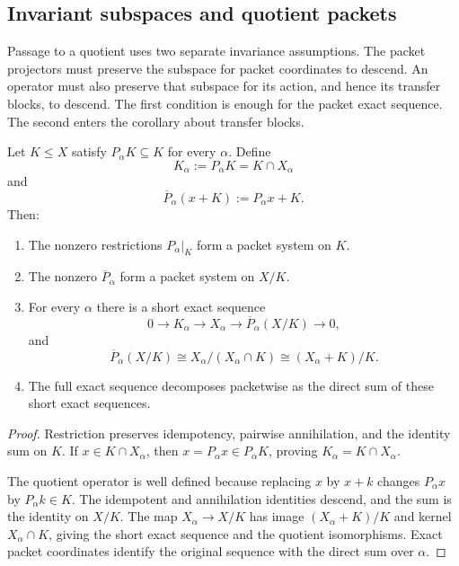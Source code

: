 \subsection{Invariant subspaces and quotient packets}
Passage to a quotient uses two separate invariance assumptions.  The packet projectors must preserve the subspace for packet coordinates to descend.  An operator must also preserve that subspace for its action, and hence its transfer blocks, to descend.  The first condition is enough for the packet exact sequence.  The second enters the corollary about transfer blocks.

\begin{theorem}
\label{thm:packet-exact-sequence}
Let $K\leq X$ satisfy $P_\alpha K\subseteq K$ for every $\alpha$.  Define
\[
K_\alpha:=P_\alpha K=K\cap X_\alpha
\]
and
\[
\overline P_\alpha(x+K):=P_\alpha x+K.
\]
Then:
\begin{enumerate}[label=(\roman*)]
\item The nonzero restrictions $P_\alpha|_K$ form a packet system on $K$.
\item The nonzero $\overline P_\alpha$ form a packet system on $X/K$.
\item For every $\alpha$ there is a short exact sequence
\[
0\longrightarrow K_\alpha
\longrightarrow X_\alpha
\longrightarrow \overline P_\alpha(X/K)
\longrightarrow0,
\]
and
\[
\overline P_\alpha(X/K)
\cong
X_\alpha/(X_\alpha\cap K)
\cong
(X_\alpha+K)/K.
\]
\item The full exact sequence decomposes packetwise as the direct sum of these short exact sequences.
\end{enumerate}
\end{theorem}

\begin{proof}
Restriction preserves idempotency, pairwise annihilation, and the identity sum on $K$.  If $x\in K\cap X_\alpha$, then $x=P_\alpha x\in P_\alpha K$, proving $K_\alpha=K\cap X_\alpha$.

The quotient operator is well defined because replacing $x$ by $x+k$ changes $P_\alpha x$ by $P_\alpha k\in K$.  The idempotent and annihilation identities descend, and the sum is the identity on $X/K$.  The map $X_\alpha\to X/K$ has image $(X_\alpha+K)/K$ and kernel $X_\alpha\cap K$, giving the short exact sequence and the quotient isomorphisms.  Exact packet coordinates identify the original sequence with the direct sum over $\alpha$.
\end{proof}

